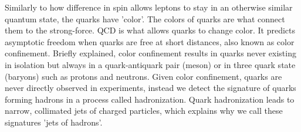 Similarly to how difference in spin allows leptons to stay in an otherwise similar quantum state, the quarks have 'color'.
The colors of quarks are what connect them to the strong-force. \ac{QCD} is what allows quarks to change color. 
It predicts asymptotic freedom when quarks are free at short distances, also known as
color confinement. Briefly explained, color confinement results in quarks never existing
in isolation but always in a quark-antiquark pair (meson) or in three quark state (baryons) such as protons and neutrons. Given color confinement,
quarks are never directly observed in experiments, instead we detect the signature of quarks forming hadrons in a process
called hadronization. Quark hadronization leads to narrow, collimated jets of charged particles, which explains why we call these signatures 
'jets of hadrons'. 
